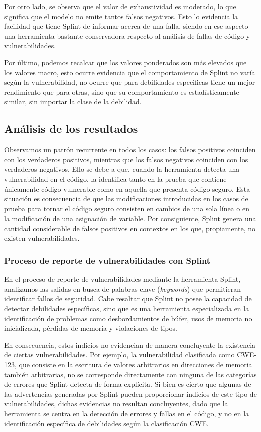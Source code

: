 \documentclass[12pt, a4paper, twoside]{article}
\begin{document}
Por otro lado, se observa que el valor de exhaustividad es moderado, lo que significa que el modelo no emite tantos falsos negativos. Esto lo evidencia la facilidad que tiene Splint de informar acerca de una falla, siendo en ese aspecto una herramienta bastante conservadora respecto al análisis de fallas de código y vulnerabilidades.

Por último, podemos recalcar que los valores ponderados son más elevados que los valores macro, esto ocurre evidencia que el comportamiento de Splint no varía según la vulnerabilidad, no ocurre que para debilidades especificas tiene un mejor rendimiento que para otras, sino que su comportamiento es estadísticamente similar, sin importar la clase de la debilidad.


\subsection{Análisis de los resultados}
Observamos un patrón recurrente en todos los casos: los falsos positivos coinciden con los verdaderos positivos, mientras que los falsos negativos coinciden con los verdaderos negativos.
Ello se debe a que, cuando la herramienta detecta una vulnerabilidad en el código, la identifica tanto en la prueba que contiene únicamente código vulnerable como en aquella que presenta código seguro. Esta situación es consecuencia de que las modificaciones introducidas en los casos de prueba para tornar el código seguro consisten en cambios de una sola línea o en la modificación de una asignación de variable. Por consiguiente, Splint genera una cantidad considerable de falsos positivos en contextos en los que, propiamente, no existen vulnerabilidades.

\subsubsection{Proceso de reporte de vulnerabilidades con Splint}
En el proceso de reporte de vulnerabilidades mediante la herramienta Splint, analizamos las salidas en busca de palabras clave (\textit{keywords}) que permitieran identificar fallos de seguridad. Cabe resaltar que Splint no posee la capacidad de detectar debilidades específicas, sino que es una herramienta especializada en la identificación de problemas como desbordamientos de búfer, usos de memoria no inicializada, pérdidas de memoria y violaciones de tipos.

En consecuencia, estos indicios no evidencian de manera concluyente la existencia de ciertas vulnerabilidades. Por ejemplo, la vulnerabilidad clasificada como CWE-123, que consiste en la escritura de valores arbitrarios en direcciones de memoria también arbitrarias, no se corresponde directamente con ninguna de las categorías de errores que Splint detecta de forma explícita. Si bien es cierto que algunas de las advertencias generadas por Splint pueden proporcionar indicios de este tipo de vulnerabilidades, dichas evidencias no resultan concluyentes, dado que la herramienta se centra en la detección de errores y fallas en el código, y no en la identificación específica de debilidades según la clasificación CWE.
\end{document}
